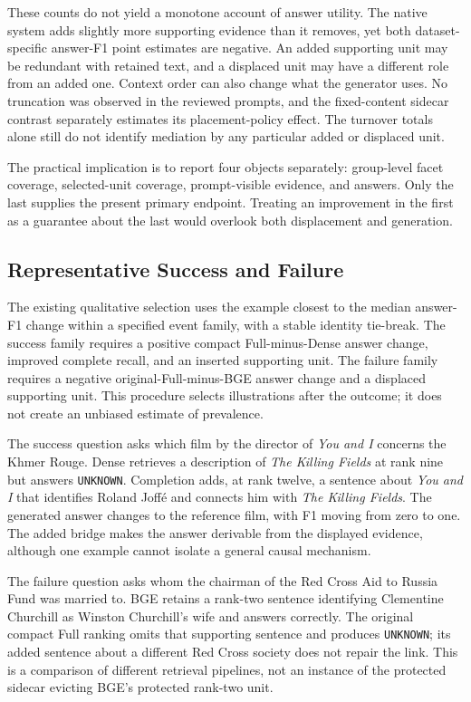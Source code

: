\documentclass[11pt,a4paper]{article}
\begin{document}
These counts do not yield a monotone account of answer utility. The native
system adds slightly more supporting evidence than it removes, yet both
dataset-specific answer-F1 point estimates are negative. An added supporting
unit may be redundant with retained text, and a displaced unit may have a
different role from an added one. Context order can also change what the
generator uses. No truncation was observed in the reviewed prompts, and the
fixed-content sidecar contrast separately estimates its placement-policy
effect. The turnover totals alone still do not identify mediation by any
particular added or displaced unit.

The practical implication is to report four objects separately: group-level
facet coverage, selected-unit coverage, prompt-visible evidence, and answers.
Only the last supplies the present primary endpoint. Treating an improvement
in the first as a guarantee about the last would overlook both displacement
and generation.

\subsection{Representative Success and Failure}
The existing qualitative selection uses the example closest to the median
answer-F1 change within a specified event family, with a stable identity
tie-break. The success family requires a positive compact Full-minus-Dense
answer change, improved complete recall, and an inserted supporting unit.
The failure family requires a negative original-Full-minus-BGE answer change
and a displaced supporting unit. This procedure selects illustrations after
the outcome; it does not create an unbiased estimate of prevalence.

The success question asks which film by the director of \emph{You and I}
concerns the Khmer Rouge. Dense retrieves a description of \emph{The Killing
Fields} at rank nine but answers \texttt{UNKNOWN}. Completion adds, at rank
twelve, a sentence about \emph{You and I} that identifies Roland Joff\'e and
connects him with \emph{The Killing Fields}. The generated answer changes to
the reference film, with F1 moving from zero to one.
The added bridge makes the answer derivable from the displayed evidence,
although one example cannot isolate a general causal mechanism.

The failure question asks whom the chairman of the Red Cross Aid to Russia
Fund was married to. BGE retains a rank-two sentence identifying Clementine
Churchill as Winston Churchill's wife and answers correctly. The original
compact Full ranking omits that supporting sentence and produces
\texttt{UNKNOWN}; its added sentence about a different Red Cross society
does not repair the link. This is a comparison of different retrieval
pipelines, not an instance of the protected sidecar evicting BGE's protected
rank-two unit.
\end{document}
